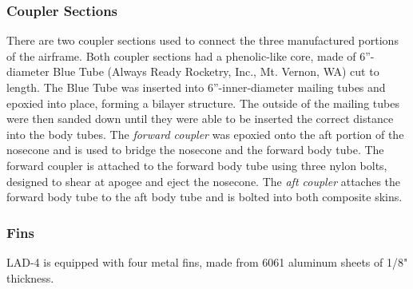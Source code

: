 \subsubsection{Coupler Sections}
There are two coupler sections used to connect the three manufactured portions of the airframe. Both coupler sections had a phenolic-like core, made of 6”-diameter Blue Tube (Always Ready Rocketry, Inc., Mt. Vernon, WA) cut to length. The Blue Tube was inserted into 6”-inner-diameter mailing tubes and epoxied into place, forming a bilayer structure. The outside of the mailing tubes were then sanded down until they were able to be inserted the correct distance into the body tubes. The \textit{forward coupler} was epoxied onto the aft portion of the nosecone and is used to bridge the nosecone and the forward body tube. The forward coupler is attached to the forward body tube using three nylon bolts, designed to shear at apogee and eject the nosecone. The \textit{aft coupler} attaches the forward body tube to the aft body tube and is bolted into both composite skins. 
\subsubsection{Fins}
LAD-4 is equipped with four metal fins, made from 6061 aluminum sheets of 1/8" thickness.
